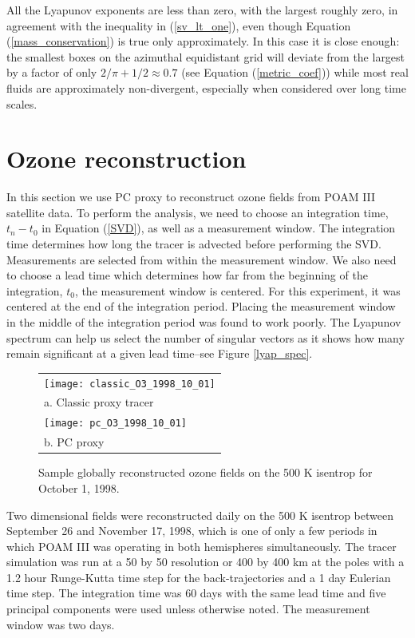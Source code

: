 All the Lyapunov exponents are less than zero, with the largest roughly zero, 
in agreement with the inequality in (\ref{sv_lt_one}),
even though Equation (\ref{mass_conservation}) is true only approximately.
In this case it is close enough: the smallest boxes on the
azimuthal equidistant grid will deviate from the largest by
a factor of only $2/\pi+1/2\approx0.7$ (see Equation (\ref{metric_coef}))
while most real fluids are approximately non-divergent, especially
when considered over long time scales.

\section{Ozone reconstruction}

In this section we use PC proxy to reconstruct ozone fields from POAM III
satellite data.
To perform the analysis, we need to choose an integration time, 
$t_n-t_0$ in Equation (\ref{SVD}), as well as a measurement window.
The integration time determines how long the tracer is advected before performing
the SVD.
Measurements are selected from within the measurement window.
We also need to choose a lead time which determines how far from the
beginning of the integration, $t_0$, the measurement window is centered.
For this experiment, it was centered at the end of the integration period.
Placing the measurement window in the middle of the integration period
was found to work poorly.
The Lyapunov spectrum can help us select the number of singular vectors
as it shows how many remain significant at
a given lead time--see Figure \ref{lyap_spec}.

\begin{figure}
  \begin{tabular}{l}
    \texttt{[image: classic\_O3\_1998\_10\_01]} \\
    a. Classic proxy tracer \\
    \texttt{[image: pc\_O3\_1998\_10\_01]} \\
    b. PC proxy
  \end{tabular}
  \caption{Sample globally reconstructed ozone fields on the 500 K isentrop for October 1, 1998.}
  \label{sample_O3_field}
\end{figure}

Two dimensional fields were reconstructed daily on the 500 K isentrop
between September 26 and November 17, 1998,
which is one of only a few periods in which POAM III was operating in both 
hemispheres simultaneously.
The tracer simulation was run at a 50 by 50 resolution or 400 by 400 km at
the poles with a 1.2 hour Runge-Kutta time step for the back-trajectories
and a 1 day Eulerian time step.
The integration time was 60 days with the same lead time
and five principal components were used unless otherwise noted.
The measurement window was two days.

